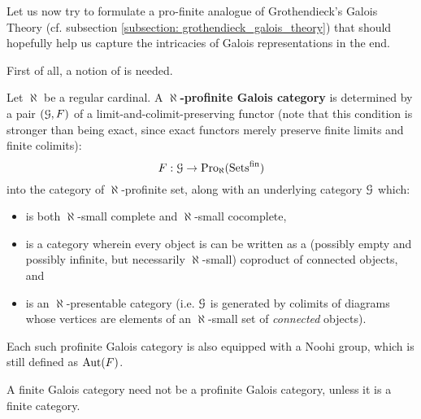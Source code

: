                    Let us now try to formulate a pro-finite analogue of Grothendieck's Galois Theory (cf. subsection \ref{subsection: grothendieck_galois_theory}) that should hopefully help us capture the intricacies of Galois representations in the end.
                    
                    First of all, a notion of  is needed.
                    \begin{definition} \label{def: profinite_galois_theories}
                        Let $\aleph$ be a regular cardinal. A \textbf{$\aleph$-profinite Galois category} is determined by a pair $(\mathcal{G}, F)$ of a limit-and-colimit-preserving functor (note that this condition is stronger than being exact, since exact functors merely preserve finite limits and finite colimits):
                            $$F: \mathcal{G} \to \mathrm{Pro}_{\aleph}(\mathrm{Sets}^{\mathrm{fin}})$$
                        into the category of $\aleph$-profinite set, along with an underlying category $\mathcal{G}$ which:
                            \begin{itemize}
                                \item is both $\aleph$-small complete and $\aleph$-small cocomplete,
                                \item is a category wherein every object is can be written as a (possibly empty and possibly infinite, but necessarily $\aleph$-small) coproduct of connected objects, and
                                \item is an $\aleph$-presentable category (i.e. $\mathcal{G}$ is generated by colimits of diagrams whose vertices are elements of an $\aleph$-small set of \textit{connected} objects).
                            \end{itemize}
                        Each such profinite Galois category is also equipped with a Noohi group, which is still defined as $\mathrm{Aut}(F)$.
                    \end{definition}
                    \begin{remark}
                        A finite Galois category need not be a profinite Galois category, unless it is a finite category. 
                    \end{remark}
                        
